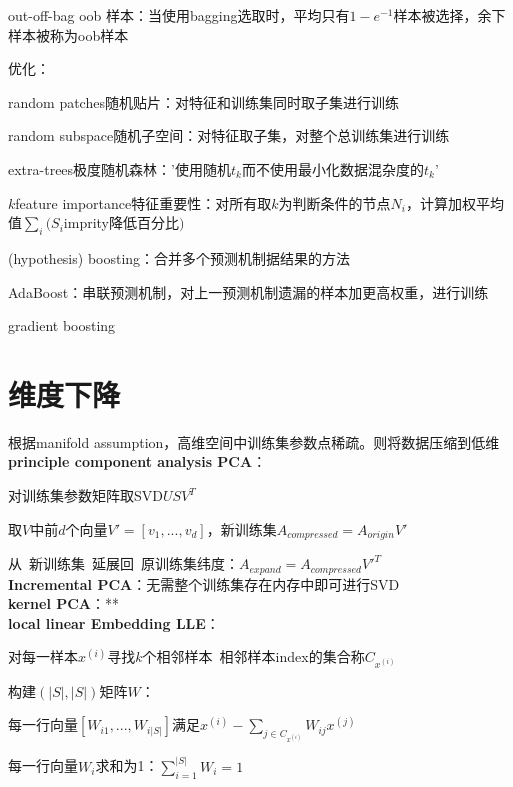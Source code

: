 \documentclass[UTF8]{ctexart}
\begin{document}
  \quad out-off-bag oob 样本：当使用bagging选取时，平均只有$1-e^{-1}$样本被选择，余下样本被称为oob样本

  优化：

  \quad random patches随机贴片：对特征和训练集同时取子集进行训练
  
  \quad random subspace随机子空间：对特征取子集，对整个总训练集进行训练
  
  \quad extra-trees极度随机森林：'使用随机$t_k$而不使用最小化数据混杂度的$t_k$'
  
  \quad $k$feature importance特征重要性：对所有取$k$为判断条件的节点$N_i$，计算加权平均值$\sum_i(S_i$imprity降低百分比$)$
  
  \quad (hypothesis) boosting：合并多个预测机制据结果的方法
  
  \quad \quad AdaBoost：串联预测机制，对上一预测机制遗漏的样本加更高权重，进行训练

  \quad \quad gradient boosting


\section{维度下降}
\noindent 根据manifold assumption，高维空间中训练集参数点稀疏。则将数据压缩到低维\\
\textbf{principle component analysis PCA}：

  对训练集参数矩阵取SVD$USV^T$

  取$V$中前$d$个向量$V' = [v_1, ..., v_d]$，新训练集$A_{compressed} = A_{origin}V'$
  
  从\ 新训练集\ 延展回\ 原训练集纬度：$A_{expand} = A_{compressed}V'^T$\\
\textbf{Incremental PCA}：无需整个训练集存在内存中即可进行SVD\\
\textbf{kernel PCA}：**\\
\textbf{local linear Embedding LLE}：
  
  对每一样本$x^{(i)}$寻找$k$个相邻样本\ 相邻样本index的集合称$C_{x^{(i)}}$
  
  构建$(|S|, |S|)$矩阵$W$：
  
  \quad 每一行向量$[W_{i1}, ..., W_{i|S|}]$满足$x^{(i)} - \sum_{j \in C_{x^{(i)}}} W_{ij}x^{(j)}$
  
  \quad 每一行向量$W_i$求和为1：$\sum_{i=1}^{|S|}W_i = 1$
\end{document}
